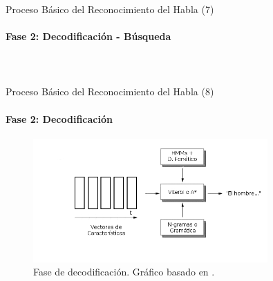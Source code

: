 \begin{frame}{Proceso B\'asico del Reconocimiento del Habla (7)}
\framesubtitle{Fase 2: Decodificaci\'on - B\'usqueda}

\begin{columns}

\begin{figure}[H]
\centering
{}
\label{figure:espacio-busqueda}
\end{figure}
\end{columns}


\end{frame}


\begin{frame}{Proceso B\'asico del Reconocimiento del Habla (8)}
\framesubtitle{Fase 2: Decodificaci\'on}
\begin{figure}[H] 
\centering
\includegraphics[width=0.8\textwidth]{./graphics/decodificacion.png}
\caption{Fase de decodificaci\'on. Gr\'afico basado en \cite{VerenichASR}.}
\label{figure:decoding}
\end{figure}
\end{frame}
